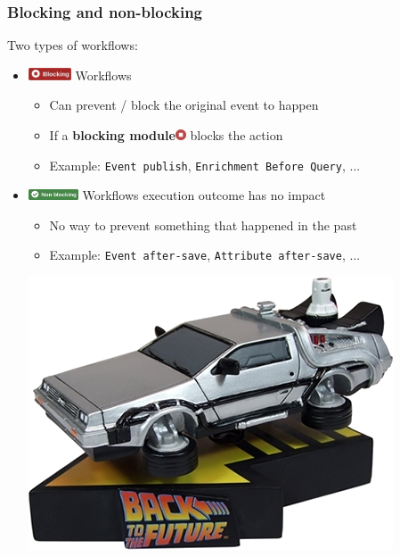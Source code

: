 \begin{frame}
    \frametitle{Blocking and non-blocking}
    Two types of workflows:
    \vspace{0.5em}
    \begin{itemize}
        \item[] \hspace*{-2em}\includegraphics[valign=m,width=48px]{pictures/blocking-workflow.png} Workflows
        \begin{itemize}
            \item Can prevent / block the original event to happen
            \item If a \textbf{blocking module}\includegraphics[valign=b,width=12px]{pictures/blocking-module.png} blocks the action
            \item Example: \texttt{Event publish}, \texttt{Enrichment Before Query}, ...
        \end{itemize}
        \vspace{0.5em}
        \item[] \hspace*{-2em}\includegraphics[valign=b,width=56px]{pictures/non-blocking-workflow.png} Workflows execution outcome has no impact
        \begin{itemize}
            \item No way to prevent something that happened in the past
            \item Example: \texttt{Event after-save}, \texttt{Attribute after-save}, ...
        \end{itemize}
        \begin{center}
            \includegraphics[width=0.3\linewidth]{pictures/time-machine.png}
        \end{center}
    \end{itemize}
\end{frame}

